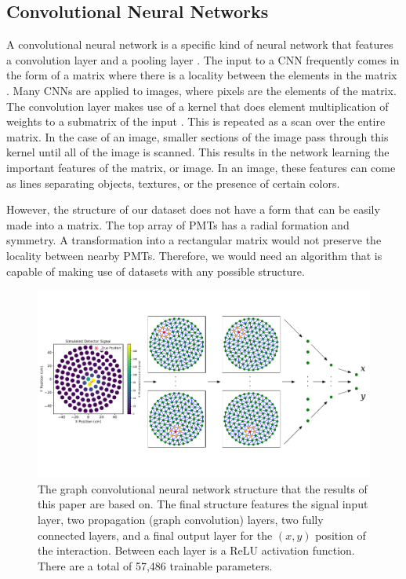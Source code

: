 \documentclass[../thesis.tex]{subfiles}
\begin{document}
\subsection{Convolutional Neural Networks}\label{subsec:CNN}
A convolutional neural network is a specific kind of neural network that features a convolution layer and a pooling layer \cite{deep-learning}.
The input to a CNN frequently comes in the form of a matrix where there is a locality between the elements in the matrix \cite{deep-learning}.
Many CNNs are applied to images, where pixels are the elements of the matrix.
The convolution layer makes use of a kernel that does element multiplication of weights to a submatrix of the input \cite{deep-learning}.
This is repeated as a scan over the entire matrix.
In the case of an image, smaller sections of the image pass through this kernel until all of the image is scanned.
This results in the network learning the important features of the matrix, or image.
In an image, these features can come as lines separating objects, textures,  or the presence of certain colors.

\par However, the structure of our dataset does not have a form that can be easily made into a matrix.
The top array of PMTs has a radial formation and symmetry.
A transformation into a rectangular matrix would not preserve the locality between nearby PMTs.
Therefore, we would need an algorithm that is capable of making use of datasets with any possible structure.
\begin{figure}[t]
	\centering
	\includegraphics[width=\linewidth]{figures/gcnn_architecture.pdf}
	\caption{
	The graph convolutional neural network structure that the results of this paper are based on.
	The final structure features the signal input layer, two propagation (graph convolution) layers, two fully connected layers, and a final output layer for the $(x,y)$ position of the interaction.
	Between each layer is a ReLU activation function.
	There are a total of 57,486 trainable parameters.
	}
	\label{fig:figures/GCNN_Structure}
\end{figure}
\end{document}

